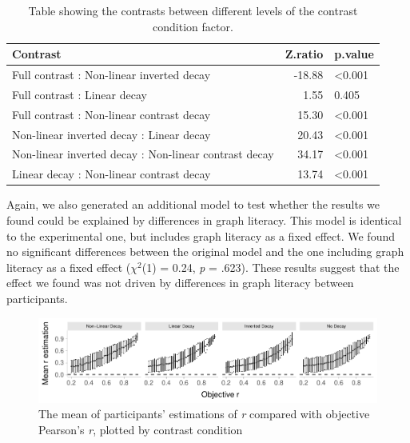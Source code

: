 \documentclass[preprint, 3p,
authoryear]{elsarticle} %
\begin{document}
\begin{table}

\caption{\label{tab:contrasts-table-e2}\label{contrasts-table-e2}Table showing the contrasts between different levels of the contrast condition factor.}
\centering
\begin{tabular}[t]{lrl}
\toprule
Contrast & Z.ratio & p.value\\
\midrule
Full contrast : Non-linear inverted decay & -18.88 & <0.001\\
Full contrast : Linear decay & 1.55 & 0.405\\
Full contrast : Non-linear contrast decay & 15.30 & <0.001\\
Non-linear inverted decay : Linear decay & 20.43 & <0.001\\
Non-linear inverted decay : Non-linear contrast decay & 34.17 & <0.001\\
Linear decay : Non-linear contrast decay & 13.74 & <0.001\\
\bottomrule
\end{tabular}
\end{table}

Again, we also generated an additional model to test whether the results
we found could be explained by differences in graph literacy. This model
is identical to the experimental one, but includes graph literacy as a
fixed effect. We found no significant differences between the original
model and the one including graph literacy as a fixed effect
(\(\chi^2\)(1) = 0.24, \emph{p} = .623). These results suggest that the
effect we found was not driven by differences in graph literacy between
participants.

\begin{figure}

{\centering \includegraphics{contrast_and_scatterplots_files/figure-latex/e2-error-plot-1} 

}

\caption{\label{e2-error-plot}The mean of participants' estimations of \textit{r} compared with objective Pearson's \textit{r}, plotted by contrast condition}\label{fig:e2-error-plot}
\end{figure}
\end{document}
